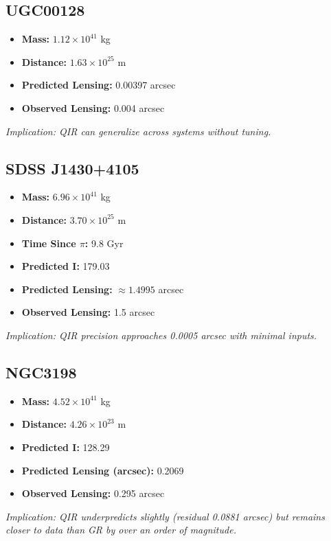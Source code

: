 \documentclass[11pt]{article}
\begin{document}
\subsection{UGC00128}
\begin{itemize}
  \item \textbf{Mass:} $1.12 \times 10^{41}$ kg
  \item \textbf{Distance:} $1.63 \times 10^{25}$ m
  \item \textbf{Predicted Lensing:} 0.00397 arcsec
  \item \textbf{Observed Lensing:} 0.004 arcsec
\end{itemize}
\textit{Implication: QIR can generalize across systems without tuning.}


\subsection{SDSS J1430+4105}
\begin{itemize}
  \item \textbf{Mass:} $6.96 \times 10^{41}$ kg
  \item \textbf{Distance:} $3.70 \times 10^{25}$ m
  \item \textbf{Time Since $\pi$:} 9.8 Gyr
  \item \textbf{Predicted I:} 179.03
  \item \textbf{Predicted Lensing:} $\approx 1.4995$ arcsec
  \item \textbf{Observed Lensing:} 1.5 arcsec
\end{itemize}
\textit{Implication: QIR precision approaches 0.0005 arcsec with minimal inputs.}

\subsection{NGC3198}
\begin{itemize}
  \item \textbf{Mass:} $4.52 \times 10^{41}$ kg
  \item \textbf{Distance:} $4.26 \times 10^{23}$ m
  \item \textbf{Predicted I:} 128.29
  \item \textbf{Predicted Lensing (arcsec):} 0.2069
  \item \textbf{Observed Lensing:} 0.295 arcsec
\end{itemize}
\textit{Implication: QIR underpredicts slightly (residual 0.0881 arcsec) but remains closer to data than GR by over an order of magnitude.}
\end{document}
